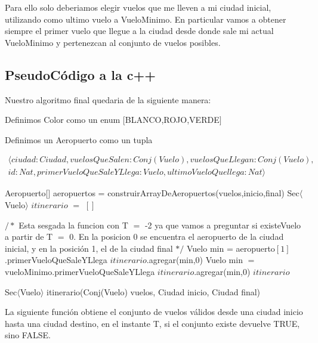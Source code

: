 Para ello solo deberiamos elegir vuelos que me lleven a mi ciudad inicial, utilizando como ultimo vuelo a VueloMinimo. En particular vamos a obtener siempre el primer vuelo que llegue a la ciudad desde donde sale mi actual VueloMinimo y pertenezcan al conjunto de vuelos posibles.

\newpage
\subsection{PseudoC\'odigo a la c++}


Nuestro algoritmo final quedaria de la siguiente manera:

Definimos Color como un enum $[$BLANCO,ROJO,VERDE$]$

Definimos un Aeropuerto como un tupla 

\begin{align*}
\langle ciudad:Ciudad,vuelosQueSalen:
Conj(Vuelo),vuelosQueLlegan:Conj(Vuelo),\\
id:Nat,primerVueloQueSaleYLlega:Vuelo,ultimoVueloQuellega:Nat \rangle 
\end{align*}

\begin{algorithm}[H]
\begin{algorithmic}[1]
\STATE Aeropuerto[] aeropuertos = construirArrayDeAeropuertos(vuelos,inicio,final)
\STATE Sec$\langle$Vuelo$\rangle$ $itinerario$ $=$ $[]$

$/*$ Esta sesgada la funcion con T $=$ -2 ya que vamos a preguntar si existeVuelo a partir de T $=$ 0.
En la posicion 0 se encuentra el aeropuerto de la ciudad inicial, y en la posici\'on 1, el de la ciudad final $*/$
	\STATE Vuelo min = aeropuerto$[1]$.primerVueloQueSaleYLlega
\STATE $itinerario$.agregar(min,0)
	\STATE Vuelo min $=$ vueloMinimo.primerVueloQueSaleYLlega
	\STATE $itinerario$.agregar(min,0)
\ENDWHILE
\ENDIF
\RETURN $itinerario$
\caption{Sec$\langle$Vuelo$\rangle$ itinerario(Conj(Vuelo) vuelos, Ciudad inicio, Ciudad final)}%
\end{algorithmic}
\end{algorithm}

\newpage
La siguiente funci\'on obtiene el conjunto de vuelos v\'alidos desde una ciudad inicio hasta una ciudad destino, en el instante T, si el conjunto existe devuelve TRUE, sino FALSE.

